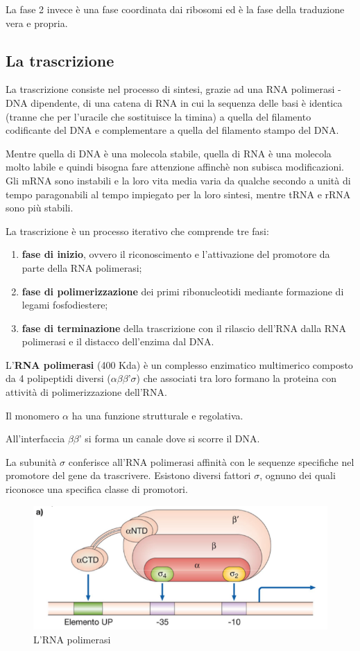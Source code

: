\documentclass[11pt]{book}
\begin{document}
La fase 2 invece è una fase coordinata dai ribosomi ed è la fase della traduzione vera e propria.

\subsection{La trascrizione} 
La trascrizione consiste nel processo di sintesi, grazie ad una RNA polimerasi - DNA dipendente, di una catena di RNA in cui la sequenza delle basi è identica (tranne che per l'uracile che sostituisce la timina) a quella del filamento codificante del DNA e complementare a quella del filamento stampo del DNA. 

\vspace{1em}
Mentre quella di DNA è una molecola stabile, quella di RNA è una molecola molto labile e quindi bisogna fare attenzione affinchè non subisca modificazioni.
Gli mRNA sono instabili e la loro vita media varia da qualche secondo a unità di tempo paragonabili al tempo impiegato per la loro sintesi, mentre tRNA e rRNA sono più stabili.

\space{1em}
La trascrizione è un processo iterativo che comprende tre fasi: 
\begin{enumerate}
\item \textbf{fase di inizio}, ovvero il riconoscimento e l'attivazione del promotore da parte della RNA polimerasi;
\item \textbf{fase di polimerizzazione} dei primi ribonucleotidi mediante formazione di legami fosfodiestere;
\item \textbf{fase di terminazione} della trascrizione con il rilascio dell’RNA dalla RNA polimerasi e il distacco dell’enzima dal DNA.
\end{enumerate}
 
L’\textbf{RNA polimerasi} (400 Kda) è un complesso enzimatico multimerico composto da 4 polipeptidi diversi ($\alpha$$\beta$$\beta$’$\sigma$) che associati tra loro formano la proteina con attività di polimerizzazione dell’RNA.

Il monomero $\alpha$ ha una funzione strutturale e regolativa. 

All’interfaccia $\beta$$\beta$’ si forma un canale dove si scorre il DNA.

La subunità $\sigma$ conferisce all’RNA polimerasi affinità con le sequenze specifiche nel promotore del gene da trascrivere. Esistono diversi fattori $\sigma$, ognuno dei quali riconosce una specifica classe di promotori.

\clearpage
\begin{figure}[htp]
\centering
\includegraphics[scale=0.5]{img/RNA polimerasi.png}
\caption{L'RNA polimerasi}
\label{}
\end{figure}
\end{document}

